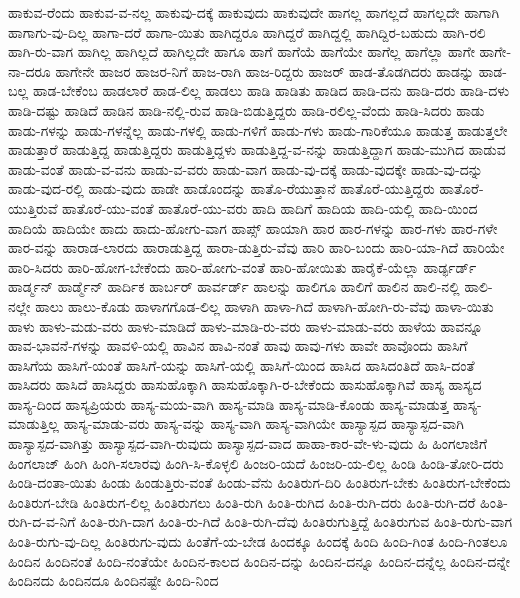 {ಹಾಕುವ-ರೆಂದು
ಹಾಕುವ-ವ-ನಲ್ಲ
ಹಾಕುವು-ದಕ್ಕೆ
ಹಾಕುವುದು
ಹಾಕುವುದೇ
ಹಾಗಲ್ಲ
ಹಾಗಲ್ಲದೆ
ಹಾಗಲ್ಲದೇ
ಹಾಗಾಗಿ
ಹಾಗಾಗು-ವು-ದಿಲ್ಲ
ಹಾಗಾ-ದರೆ
ಹಾಗಾ-ಯಿತು
ಹಾಗಿದ್ದರೂ
ಹಾಗಿದ್ದರೆ
ಹಾಗಿದ್ದಲ್ಲಿ
ಹಾಗಿದ್ದಿರ-ಬಹುದು
ಹಾಗಿ-ರಲಿ
ಹಾಗಿ-ರು-ವಾಗ
ಹಾಗಿಲ್ಲ
ಹಾಗಿಲ್ಲದೆ
ಹಾಗಿಲ್ಲದೇ
ಹಾಗೂ
ಹಾಗೆ
ಹಾಗೆಯೆ
ಹಾಗೆಯೇ
ಹಾಗೆಲ್ಲ
ಹಾಗೆಲ್ಲಾ
ಹಾಗೇ
ಹಾಗೇ-ನಾ-ದರೂ
ಹಾಗೇನೇ
ಹಾಜರ
ಹಾಜರ-ನಿಗೆ
ಹಾಜ-ರಾಗಿ
ಹಾಜ-ರಿದ್ದರು
ಹಾಜರ್
ಹಾಡ-ತೊಡಗಿದರು
ಹಾಡನ್ನು
ಹಾಡ-ಬಲ್ಲ
ಹಾಡ-ಬೇಕೆಂಬ
ಹಾಡಲಾರೆ
ಹಾಡ-ಲಿಲ್ಲ
ಹಾಡಲು
ಹಾಡಿ
ಹಾಡಿತು
ಹಾಡಿದ
ಹಾಡಿ-ದನು
ಹಾಡಿ-ದರು
ಹಾಡಿ-ದಳು
ಹಾಡಿ-ದಷ್ಟು
ಹಾಡಿದೆ
ಹಾಡಿನ
ಹಾಡಿ-ನಲ್ಲಿ-ರುವ
ಹಾಡಿ-ಬಿಡುತ್ತಿದ್ದರು
ಹಾಡಿ-ರಲಿಲ್ಲ-ವೆಂದು
ಹಾಡಿ-ಸಿದರು
ಹಾಡು
ಹಾಡು-ಗಳನ್ನು
ಹಾಡು-ಗಳನ್ನೆಲ್ಲ
ಹಾಡು-ಗಳಲ್ಲಿ
ಹಾಡು-ಗಳಿಗೆ
ಹಾಡು-ಗಳು
ಹಾಡು-ಗಾರಿಕೆಯೂ
ಹಾಡುತ್ತ
ಹಾಡುತ್ತಲೇ
ಹಾಡುತ್ತಾರೆ
ಹಾಡುತ್ತಿದ್ದ
ಹಾಡುತ್ತಿದ್ದರು
ಹಾಡುತ್ತಿದ್ದಳು
ಹಾಡುತ್ತಿದ್ದ-ವ-ನನ್ನು
ಹಾಡುತ್ತಿದ್ದಾಗ
ಹಾಡು-ಮುಗಿದ
ಹಾಡುವ
ಹಾಡು-ವಂತೆ
ಹಾಡು-ವ-ವನು
ಹಾಡು-ವ-ವರು
ಹಾಡು-ವಾಗ
ಹಾಡು-ವು-ದಕ್ಕೆ
ಹಾಡು-ವುದಕ್ಕೇ
ಹಾಡು-ವು-ದನ್ನು
ಹಾಡು-ವುದ-ರಲ್ಲಿ
ಹಾಡು-ವುದು
ಹಾಡೇ
ಹಾಡೊಂದನ್ನು
ಹಾತೊ-ರೆಯುತ್ತಾನೆ
ಹಾತೊರೆ-ಯುತ್ತಿದ್ದರು
ಹಾತೊರೆ-ಯುತ್ತಿರುವೆ
ಹಾತೊರೆ-ಯು-ವಂತೆ
ಹಾತೊರೆ-ಯು-ವರು
ಹಾದಿ
ಹಾದಿಗೆ
ಹಾದಿಯ
ಹಾದಿ-ಯಲ್ಲಿ
ಹಾದಿ-ಯಿಂದ
ಹಾದಿಯೆ
ಹಾದಿಯೇ
ಹಾದು
ಹಾದು-ಹೋಗು-ವಾಗ
ಹಾಪ್ಸ್
ಹಾಯಾಗಿ
ಹಾರ
ಹಾರ-ಗಳನ್ನು
ಹಾರ-ಗಳು
ಹಾರ-ಗಳೇ
ಹಾರ-ವನ್ನು
ಹಾರಾಡ-ಲಾರದು
ಹಾರಾಡುತ್ತಿದ್ದ
ಹಾರಾ-ಡುತ್ತಿರು-ವೆವು
ಹಾರಿ
ಹಾರಿ-ಬಂದು
ಹಾರಿ-ಯಾ-ಗಿದೆ
ಹಾರಿಯೇ
ಹಾರಿ-ಸಿದರು
ಹಾರಿ-ಹೋಗ-ಬೇಕೆಂದು
ಹಾರಿ-ಹೋಗು-ವಂತೆ
ಹಾರಿ-ಹೋಯಿತು
ಹಾರೈಕೆ-ಯೆಲ್ಲಾ
ಹಾರ್ಡ್ಫರ್ಡ್
ಹಾರ್ಡ್ಮನ್
ಹಾರ್ಡ್ಮೆನ್
ಹಾರ್ದಿಕ
ಹಾರ್ಬರ್
ಹಾರ್ವರ್ಡ್
ಹಾಲನ್ನು
ಹಾಲಿಗೂ
ಹಾಲಿಗೆ
ಹಾಲಿನ
ಹಾಲಿ-ನಲ್ಲಿ
ಹಾಲಿ-ನಲ್ಲೇ
ಹಾಲು
ಹಾಲು-ಕೊಡು
ಹಾಳಾಗಗೊಡ-ಲಿಲ್ಲ
ಹಾಳಾಗಿ
ಹಾಳಾ-ಗಿದೆ
ಹಾಳಾಗಿ-ಹೋಗಿ-ರು-ವೆವು
ಹಾಳಾ-ಯಿತು
ಹಾಳು
ಹಾಳು-ಮಡು-ವರು
ಹಾಳು-ಮಾಡಿದೆ
ಹಾಳು-ಮಾಡಿ-ರು-ವರು
ಹಾಳು-ಮಾಡು-ವರು
ಹಾಳೆಯ
ಹಾವನ್ನೂ
ಹಾವ-ಭಾವನೆ-ಗಳನ್ನು
ಹಾವಳಿ-ಯಲ್ಲಿ
ಹಾವಿನ
ಹಾವಿ-ನಂತೆ
ಹಾವು
ಹಾವು-ಗಳು
ಹಾವೇ
ಹಾವೊಂದು
ಹಾಸಿಗೆ
ಹಾಸಿಗೆಯ
ಹಾಸಿಗೆ-ಯಂತೆ
ಹಾಸಿಗೆ-ಯನ್ನು
ಹಾಸಿಗೆ-ಯಲ್ಲಿ
ಹಾಸಿಗೆ-ಯಿಂದ
ಹಾಸಿದ
ಹಾಸಿದಂತಿದೆ
ಹಾಸಿ-ದಂತೆ
ಹಾಸಿದರು
ಹಾಸಿದೆ
ಹಾಸಿದ್ದರು
ಹಾಸುಹೊಕ್ಕಾಗಿ
ಹಾಸುಹೊಕ್ಕಾಗಿ-ರ-ಬೇಕೆಂದು
ಹಾಸುಹೊಕ್ಕಾಗಿವೆ
ಹಾಸ್ಯ
ಹಾಸ್ಯದ
ಹಾಸ್ಯ-ದಿಂದ
ಹಾಸ್ಯಪ್ರಿಯರು
ಹಾಸ್ಯ-ಮಯ-ವಾಗಿ
ಹಾಸ್ಯ-ಮಾಡಿ
ಹಾಸ್ಯ-ಮಾಡಿ-ಕೊಂಡು
ಹಾಸ್ಯ-ಮಾಡುತ್ತ
ಹಾಸ್ಯ-ಮಾಡುತ್ತಿಲ್ಲ
ಹಾಸ್ಯ-ಮಾಡು-ವರು
ಹಾಸ್ಯ-ವನ್ನು
ಹಾಸ್ಯ-ವಾಗಿ
ಹಾಸ್ಯ-ವಾಗಿಯೇ
ಹಾಸ್ಯಾಸ್ಪದ
ಹಾಸ್ಯಾಸ್ಪದ-ವಾಗಿ
ಹಾಸ್ಯಾಸ್ಪದ-ವಾಗಿತ್ತು
ಹಾಸ್ಯಾಸ್ಪದ-ವಾಗಿ-ರುವುದು
ಹಾಸ್ಯಾಸ್ಪದ-ವಾದ
ಹಾಹಾ-ಕಾರ-ವೇ-ಳು-ವುದು
ಹಿ
ಹಿಂಗಲಾಜಿಗೆ
ಹಿಂಗಲಾಜ್
ಹಿಂಗಿ
ಹಿಂಗಿ-ಸಲಾರವು
ಹಿಂಗಿ-ಸಿ-ಕೊಳ್ಳಲಿ
ಹಿಂಜರಿ-ಯದೆ
ಹಿಂಜರಿ-ಯ-ಲಿಲ್ಲ
ಹಿಂಡಿ
ಹಿಂಡಿ-ತೋರಿ-ದರು
ಹಿಂಡಿ-ದಂತಾ-ಯಿತು
ಹಿಂಡು
ಹಿಂಡುತ್ತಿರು-ವಂತೆ
ಹಿಂಡು-ವೆನು
ಹಿಂತಿರುಗ-ದಿರಿ
ಹಿಂತಿರುಗ-ಬೇಕು
ಹಿಂತಿರುಗ-ಬೇಕೆಂದು
ಹಿಂತಿರುಗ-ಬೇಡಿ
ಹಿಂತಿರುಗ-ಲಿಲ್ಲ
ಹಿಂತಿರುಗಲು
ಹಿಂತಿ-ರುಗಿ
ಹಿಂತಿ-ರುಗಿದ
ಹಿಂತಿ-ರುಗಿ-ದರು
ಹಿಂತಿ-ರುಗಿ-ದರೆ
ಹಿಂತಿ-ರುಗಿ-ದ-ವ-ನಿಗೆ
ಹಿಂತಿ-ರುಗಿ-ದಾಗ
ಹಿಂತಿ-ರು-ಗಿದೆ
ಹಿಂತಿ-ರುಗಿ-ದೆವು
ಹಿಂತಿರುಗುತ್ತಿದ್ದೆ
ಹಿಂತಿರುಗುವ
ಹಿಂತಿ-ರುಗು-ವಾಗ
ಹಿಂತಿ-ರುಗು-ವು-ದಿಲ್ಲ
ಹಿಂತಿರುಗು-ವುದು
ಹಿಂತೆಗೆ-ಯ-ಬೇಡ
ಹಿಂದಕ್ಕೂ
ಹಿಂದಕ್ಕೆ
ಹಿಂದಿ
ಹಿಂದಿ-ಗಿಂತ
ಹಿಂದಿ-ಗಿಂತಲೂ
ಹಿಂದಿನ
ಹಿಂದಿನಂತೆ
ಹಿಂದಿ-ನಂತೆಯೇ
ಹಿಂದಿನ-ಕಾಲದ
ಹಿಂದಿನ-ದನ್ನು
ಹಿಂದಿನ-ದನ್ನೂ
ಹಿಂದಿನ-ದನ್ನೆಲ್ಲ
ಹಿಂದಿನ-ದನ್ನೇ
ಹಿಂದಿನದು
ಹಿಂದಿನದೂ
ಹಿಂದಿನಷ್ಟೇ
ಹಿಂದಿ-ನಿಂದ
}
